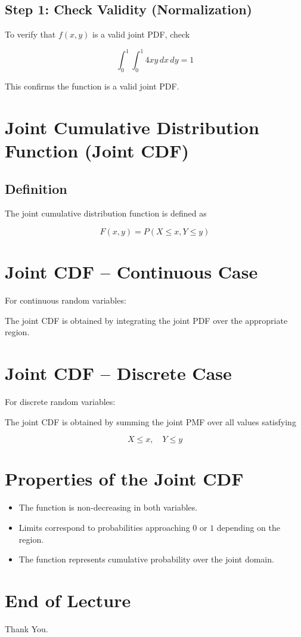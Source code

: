 \documentclass[12pt]{article}
\begin{document}
\subsection{Step 1: Check Validity (Normalization)}

To verify that $f(x,y)$ is a valid joint PDF, check

\[
\int_0^1 \int_0^1 4xy \, dx \, dy = 1
\]

This confirms the function is a valid joint PDF.

\section{Joint Cumulative Distribution Function (Joint CDF)}

\subsection{Definition}

The joint cumulative distribution function is defined as

\[
F(x,y) = P(X \le x, Y \le y)
\]

\section{Joint CDF -- Continuous Case}

For continuous random variables:

The joint CDF is obtained by integrating the joint PDF over the appropriate region.

\section{Joint CDF -- Discrete Case}

For discrete random variables:

The joint CDF is obtained by summing the joint PMF over all values satisfying

\[
X \le x, \quad Y \le y
\]

\section{Properties of the Joint CDF}

\begin{itemize}
\item The function is non-decreasing in both variables.
\item Limits correspond to probabilities approaching $0$ or $1$ depending on the region.
\item The function represents cumulative probability over the joint domain.
\end{itemize}

\section*{End of Lecture}

Thank You.
\end{document}
